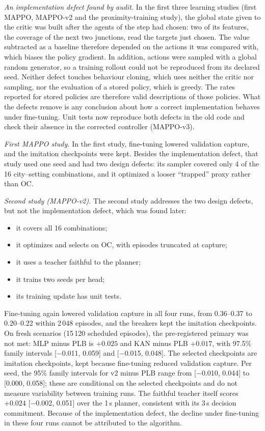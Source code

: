 \documentclass[preprint,12pt]{elsarticle}
\begin{document}
\emph{An implementation defect found by audit.} In the first three learning studies (first MAPPO, MAPPO-v2 and the
proximity-training study), the global state given to the critic was built after the agents of the step had chosen:
two of its features, the coverage of the next two junctions, read the targets just chosen. The value subtracted as a
baseline therefore depended on the actions it was compared with, which biases the policy gradient. In addition, actions
were sampled with a global random generator, so a training rollout could not be reproduced from its declared seed.
Neither defect touches behaviour cloning, which uses neither the critic nor sampling, nor the evaluation of a stored
policy, which is greedy. The rates reported for stored policies are therefore valid descriptions of those policies.
What the defects remove is any conclusion about how a correct implementation behaves under fine-tuning. Unit tests
now reproduce both defects in the old code and check their absence in the corrected controller (MAPPO-v3).

\emph{First MAPPO study.} In the first study, fine-tuning lowered validation capture, and the imitation checkpoints
were kept. Besides the implementation defect, that study used one seed and had two design defects: its sampler
covered only 4 of the 16 city--setting combinations, and it optimized a looser ``trapped'' proxy rather than OC.

\emph{Second study (MAPPO-v2).} The second study addresses the two design defects, but not the implementation
defect, which was found later:
\begin{itemize}
\item it covers all 16 combinations;
\item it optimizes and selects on OC, with episodes truncated at capture;
\item it uses a teacher faithful to the planner;
\item it trains two seeds per head;
\item its training update has unit tests.
\end{itemize}
Fine-tuning again lowered validation capture in all four runs, from 0.36--0.37 to 0.20--0.22 within
2\,048 episodes, and the breakers kept the imitation checkpoints. On fresh scenarios (15\,120 scheduled episodes), the
pre-registered primary was not met: MLP minus PLB is $+0.025$ and KAN minus PLB $+0.017$, with 97.5\% family intervals
[$-$0.011, 0.059] and [$-$0.015, 0.048]. The selected checkpoints are imitation checkpoints, kept because fine-tuning
reduced validation capture. Per seed, the 95\% family intervals for v2 minus PLB range from [$-$0.010, 0.044] to
[0.000, 0.058]; these are conditional on the selected checkpoints and do not measure variability between training
runs. The faithful teacher itself scores $+0.024$ [$-$0.002, 0.051] over the 1\,s planner, consistent with its 3\,s
decision commitment. Because of the implementation defect, the decline under fine-tuning in these four runs cannot
be attributed to the algorithm.
\end{document}
